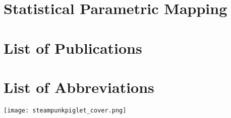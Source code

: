 \documentclass[12pt,twoside]{report}
\newcommand\cleartorightpage{%
\clearpage
\hbox{}
}
\newcommand\chng[1]{{\color{darkgreen}#1}}
\newcommand{\setbackgroundcolour}{\pagecolor[rgb]{0.10,0.10,0.10}}
\newcommand{\settextcolour}{\color[rgb]{1.0,1.0,1.0}}
\newcommand{\invertbackgroundtext}{\setbackgroundcolour\settextcolour}
\begin{document}
\clearpage
\section{Statistical Parametric Mapping}\label{cpt:spm1d}
%

\clearpage
\section{\chng{List of Publications}}\label{cpt:publications}
%


\clearpage
\section{List of Abbreviations}\label{abbreviations}
\begin{spacing}{1.5}
%
\end{spacing}


\cleartorightpage\clearpage
\makeatletter
\invertbackgroundtext
\vspace{\fill}
\texttt{[image: steampunkpiglet\_cover.png]}
\vspace{\fill}
\makeatother
\thispagestyle{empty}
\end{document}
